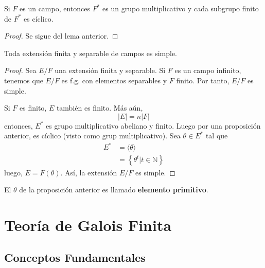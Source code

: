 \documentclass[12pt]{report}
\theoremstyle{largebreak}
\begin{document}
    \begin{propo}
        Si $F$ es un campo, entonces $F^*$ es un grupo multiplicativo y cada subgrupo finito de $F^*$ es cíclico.
    \end{propo}

    \begin{proof}
        Se sigue del lema anterior.
    \end{proof}

    \begin{theor}
        Toda extensión finita y separable de campos es simple.
    \end{theor}

    \begin{proof}
        Sea $E/F$ una extensión finita y separable. Si $F$ es un campo infinito, tenemos que $E/F$ es f.g. con elementos separables y $F$ finito. Por tanto, $E/F$ es simple.

        Si $F$ es finito, $E$ también es finito. Más aún,
        \begin{equation*}
            |E|=n|F|
        \end{equation*}
        entonces, $E^*$ es grupo multiplicativo abeliano y finito. Luego por una proposición anterior, es cíclico (visto como grup multiplicativo). Sea $\theta\in E^*$ tal que
        \begin{equation*}
            \begin{split}
                E^*&=\langle\theta \rangle\\
                &=\left\{\theta^t\Big|t\in\mathbb{N} \right\}
            \end{split}
        \end{equation*}
        luego, $E=F(\theta)$. Así, la extensión $E/F$ es simple.

    \end{proof}

    \begin{obs}
        El $\theta$ de la proposición anterior es llamado \textbf{elemento primitivo}.
    \end{obs}

    \chapter{Teoría de Galois Finita}

    \section{Conceptos Fundamentales}
\end{document}
